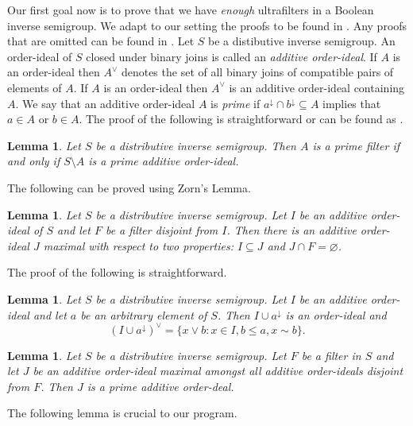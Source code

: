 \documentclass[a4paper]{amsart}
\newtheorem{lemma}[theorem]{Lemma}
\begin{document}
Our first goal now is to prove that we have {\em enough} ultrafilters in a Boolean inverse semigroup.
We adapt to our setting the proofs to be found in \cite[Chapter I, Section 2]{Johnstone}.
Any proofs that are omitted can be found in \cite{LL}.
Let $S$ be a distibutive inverse semigroup.
An order-ideal of $S$ closed under binary joins is called an {\em additive order-ideal}.
If $A$ is an order-ideal then $A^{\vee}$ denotes the set of all binary joins of compatible pairs of elements of $A$.
If $A$ is an order-ideal then $A^{\vee}$ is an additive order-ideal containing $A$.
We say that an additive order-ideal $A$ is {\em prime} if $a^{\downarrow} \cap b^{\downarrow} \subseteq A$ 
implies that $a \in A$ or $b \in A$.
The proof of the following is straightforward or can be found as
\cite[Lemma 3.10]{LL}.

\begin{lemma}\label{lem:prime-filter} Let $S$ be a distributive inverse semigroup.
Then $A$ is a prime filter if and only if
$S \setminus A$ is a prime additive order-ideal.
\end{lemma}

The following can be proved using Zorn's Lemma.

\begin{lemma}\label{lem:ZL} Let $S$ be a distributive inverse semigroup.
Let $I$ be an additive order-ideal of $S$ and let $F$ be a filter disjoint from $I$.
Then there is an additive order-ideal $J$ maximal with respect to two properties:
$I \subseteq J$ and $J \cap F = \varnothing$.
\end{lemma}


The proof of the following is straightforward.

\begin{lemma} Let $S$ be a distributive inverse semigroup.
Let $I$ be an additive order-ideal and let $a$ be an arbitrary element of $S$.
Then $I \cup a^{\downarrow}$ is an order-ideal
and
$$\left( I \cup a^{\downarrow} \right)^{\vee}
=
\{x \vee b \colon x \in I, b \leq a, x \sim b \}.$$ 
\end{lemma}


\begin{lemma}\label{lem:prime} Let $S$ be a distributive inverse semigroup.
Let $F$ be a filter in $S$ and let $J$ be an additive order-ideal
maximal amongst all additive order-ideals disjoint from $F$.
Then $J$ is a prime additive order-deal.
\end{lemma}

The following lemma is crucial to our program.
\end{document}

